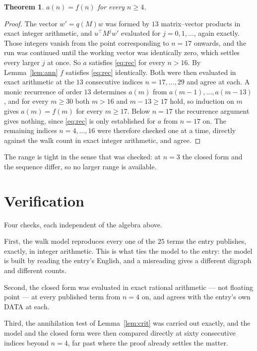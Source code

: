 \documentclass[11pt,a4paper]{article}
\theoremstyle{plain}
\newtheorem{theorem}{Theorem}
\theoremstyle{definition}
\begin{document}
\begin{theorem}
$a(n)=f(n)$ for every $n\ge4$.
\end{theorem}

\begin{proof}
The vector $w'=q(M)w$ was formed by $13$ matrix--vector products in exact integer
arithmetic, and $u^{\!\top}M^{j}w'$ evaluated for $j=0,1,\dots$, again exactly. Those integers
vanish from the point corresponding to $n=17$ onwards, and the run was continued until the
working vector was identically zero, which settles every larger $j$ at once. So $a$ satisfies
\eqref{eq:rec} for every $n>16$. By Lemma~\ref{lem:ann} $f$ satisfies \eqref{eq:rec}
identically. Both were then evaluated in exact arithmetic at the $13$ consecutive indices
$n=17,\dots,29$ and agree at each. A monic recurrence of order $13$
determines $a(m)$ from $a(m-1),\dots,a(m-13)$, and for every $m\ge30$ both
$m>16$ and $m-13\ge17$ hold, so induction on $m$ gives $a(m)=f(m)$ for every
$m\ge17$.
Below $n=17$ the recurrence argument gives nothing, since \eqref{eq:rec} is only
established for $a$ from $n=17$ on. The remaining indices $n=4,\dots,16$ were
therefore checked one at a time, directly against the walk count in exact integer arithmetic,
and agree.
\end{proof}

The range is tight in the sense that was checked: at $n=3$ the closed form and the sequence differ, so no larger range is available.

\section{Verification}

Four checks, each independent of the algebra above.

First, the walk model reproduces every one of the $25$ terms the entry publishes,
exactly, in integer arithmetic. This is what ties the model to the entry: the model is built
by reading the entry's English, and a misreading gives a different digraph and different
counts.

Second, the closed form was evaluated in exact rational arithmetic --- not floating point ---
at every published term from $n=4$ on, and agrees with the entry's own DATA at each.

Third, the annihilation test of Lemma~\ref{lem:crit} was carried out exactly, and the model
and the closed form were then compared directly at sixty consecutive indices beyond
$n=4$, far past where the proof already settles the matter.
\end{document}
